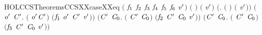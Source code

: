 \begin{SaveVerbatim}{HOLCCSTheoremsCCSXXcaseXXeq}
\HOLTokenTurnstile{} \ensuremath{(}    \ensuremath{\HOLFreeVar{f}\sb{\mathrm{1}}} \ensuremath{\HOLFreeVar{f}\sb{\mathrm{2}}} \ensuremath{\HOLFreeVar{f}\sb{\mathrm{3}}} \ensuremath{\HOLFreeVar{f}\sb{\mathrm{4}}} \ensuremath{\HOLFreeVar{f}\sb{\mathrm{5}}} \ensuremath{\HOLFreeVar{f}\sb{\mathrm{6}}} \HOLSymConst{\ensuremath{=}} \ensuremath{\HOLFreeVar{v}\sp{\prime}}\ensuremath{)} \HOLSymConst{\HOLTokenEquiv{}}
   \ensuremath{(} \HOLSymConst{\ensuremath{=}} \ensuremath{)} \HOLSymConst{\HOLTokenConj{}} \ensuremath{(} \HOLSymConst{\ensuremath{=}} \ensuremath{\HOLFreeVar{v}\sp{\prime}}\ensuremath{)} \HOLSymConst{\HOLTokenDisj{}} \ensuremath{(}\HOLSymConst{\HOLTokenExists{}}. \ensuremath{(} \HOLSymConst{\ensuremath{=}}  \ensuremath{)} \HOLSymConst{\HOLTokenConj{}} \ensuremath{(}  \HOLSymConst{\ensuremath{=}} \ensuremath{\HOLFreeVar{v}\sp{\prime}}\ensuremath{)}\ensuremath{)} \HOLSymConst{\HOLTokenDisj{}}
   \ensuremath{(}\HOLSymConst{\HOLTokenExists{}}\ensuremath{\HOLBoundVar{o}\sp{\prime}} \ensuremath{\HOLBoundVar{C}\sp{\prime}}. \ensuremath{(} \HOLSymConst{\ensuremath{=}} \ensuremath{\HOLBoundVar{o}\sp{\prime}}\HOLSymConst{\ensuremath{\ldotp}}\ensuremath{\HOLBoundVar{C}\sp{\prime}}\ensuremath{)} \HOLSymConst{\HOLTokenConj{}} \ensuremath{(}\ensuremath{\HOLFreeVar{f}\sb{\mathrm{1}}} \ensuremath{\HOLBoundVar{o}\sp{\prime}} \ensuremath{\HOLBoundVar{C}\sp{\prime}} \HOLSymConst{\ensuremath{=}} \ensuremath{\HOLFreeVar{v}\sp{\prime}}\ensuremath{)}\ensuremath{)} \HOLSymConst{\HOLTokenDisj{}}
   \ensuremath{(}\HOLSymConst{\HOLTokenExists{}}\ensuremath{\HOLBoundVar{C}\sp{\prime}} \ensuremath{\HOLBoundVar{C}\sb{\mathrm{0}}}. \ensuremath{(} \HOLSymConst{\ensuremath{=}} \ensuremath{\HOLBoundVar{C}\sp{\prime}} \HOLSymConst{\ensuremath{+}} \ensuremath{\HOLBoundVar{C}\sb{\mathrm{0}}}\ensuremath{)} \HOLSymConst{\HOLTokenConj{}} \ensuremath{(}\ensuremath{\HOLFreeVar{f}\sb{\mathrm{2}}} \ensuremath{\HOLBoundVar{C}\sp{\prime}} \ensuremath{\HOLBoundVar{C}\sb{\mathrm{0}}} \HOLSymConst{\ensuremath{=}} \ensuremath{\HOLFreeVar{v}\sp{\prime}}\ensuremath{)}\ensuremath{)} \HOLSymConst{\HOLTokenDisj{}}
   \ensuremath{(}\HOLSymConst{\HOLTokenExists{}}\ensuremath{\HOLBoundVar{C}\sp{\prime}} \ensuremath{\HOLBoundVar{C}\sb{\mathrm{0}}}. \ensuremath{(} \HOLSymConst{\ensuremath{=}} \ensuremath{\HOLBoundVar{C}\sp{\prime}} \HOLSymConst{\ensuremath{\mid}} \ensuremath{\HOLBoundVar{C}\sb{\mathrm{0}}}\ensuremath{)} \HOLSymConst{\HOLTokenConj{}} \ensuremath{(}\ensuremath{\HOLFreeVar{f}\sb{\mathrm{3}}} \ensuremath{\HOLBoundVar{C}\sp{\prime}} \ensuremath{\HOLBoundVar{C}\sb{\mathrm{0}}} \HOLSymConst{\ensuremath{=}} \ensuremath{\HOLFreeVar{v}\sp{\prime}}\ensuremath{)}\ensuremath{)} \HOLSymConst{\HOLTokenDisj{}}

\end{SaveVerbatim}
